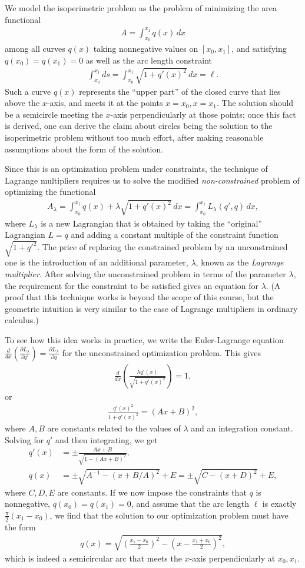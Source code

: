 \documentclass[12pt]{amsart}
\newcommand{\eqst}[1]{\begin{align*}#1\end{align*}}
\newcommand{\der}[2]{\frac{d#1}{d#2}}
\newcommand{\pder}[2]{\frac{\partial#1}{\partial#2}}
\newcounter{exercise}
\begin{document}
We model the isoperimetric problem as the problem of minimizing the area functional
\eqst{
A = \int_{x_0}^{x_1} q(x)\,dx
}
among all curves $q(x)$ taking nonnegative values on $[x_0,x_1]$, and satisfying $q(x_0)=q(x_1)=0$ as well as the arc length constraint
\eqst{
\int_{x_0}^{x_1} ds =  \int_{x_0}^{x_1} \sqrt{1+q'(x)^2}\,dx = \ell.
}
Such a curve $q(x)$ represents the ``upper part'' of the closed  curve that lies above the $x$-axis, and meets it at the points $x=x_0, x=x_1$. The solution should be a semicircle meeting the $x$-axis perpendicularly at those points; once this fact is derived, one can derive the claim about circles being the solution to the isoperimetric problem without too much effort, after making reasonable assumptions about the form of the solution. %

Since this is an optimization problem under constraints, the technique of Lagrange multipliers requires us to solve the modified \emph{non-constrained} problem of optimizing the functional
\eqst{
A_\lambda = \int_{x_0}^{x_1} q(x) + \lambda \sqrt{1+q'(x)^2}\,dx
= \int_{x_0}^{x_1} L_\lambda(q',q)\,dx,
}
where $L_\lambda$ is a new Lagrangian that is obtained by taking the ``original'' Lagrangian $L=q$ and adding a constant multiple of the constraint function $\sqrt{1+q'^2}$. The price of replacing the constrained problem by an unconstrained one is the introduction of an additional parameter, $\lambda$, known as the \emph{Lagrange multiplier}. After solving the unconstrained problem in terms of the parameter $\lambda$, the requirement for the constraint to be satisfied gives an equation for $\lambda$. (A proof that this technique works is beyond the scope of this course, but the geometric intuition is very similar to the case of Lagrange multipliers in ordinary calculus.)

To see how this idea works in practice, we write the Euler-Lagrange equation $\der{}{x}\left(\pder{L_\lambda}{q'}\right) = \pder{L_\lambda}{q}$ for the unconstrained optimization problem. This gives
\eqst{
\der{}{x}\left( \frac{\lambda q'(x)}{\sqrt{1+q'(x)^2}}\right) = 1,
}
or
\eqst{
\frac{q'(x)^2}{1+q'(x)^2} = (Ax+B)^2,
}
where $A,B$ are constants related to the values of $\lambda$ and an integration constant. 
Solving for $q'$ and then integrating, we get
\eqst{
q'(x) &= \pm \frac{Ax+B}{\sqrt{1-(Ax+B)^2}}, \\
q(x) &= \pm \sqrt{A^{-1}-(x+B/A)^2}+E = \pm \sqrt{C-(x+D)^2} + E,
}
where $C,D,E$ are constants. If we now impose the constraints that $q$ is nonnegative, $q(x_0)=q(x_1)=0$, and assume that the arc length $\ell$ is exactly $\frac{\pi}{2}(x_1-x_0)$, we find that the solution to our optimization problem must have the form
\eqst{
q(x) = \sqrt{\left(\frac{x_1-x_0}{2}\right)^2 - \left(x-\frac{x_1+x_0}{2}\right)^2},
}
which is indeed a semicircular arc that meets the $x$-axis perpendicularly at $x_0,x_1$.
\end{document}
